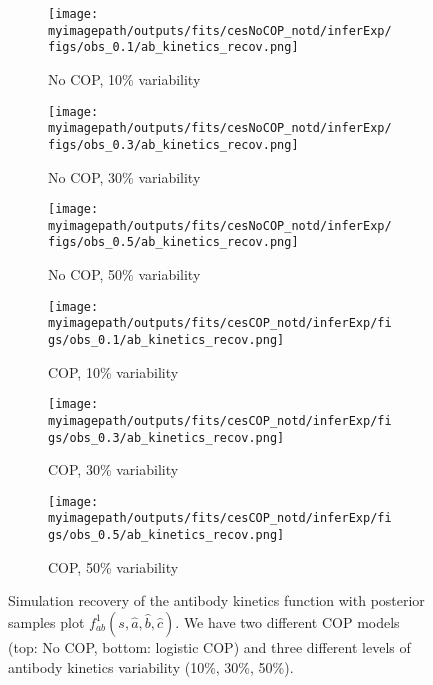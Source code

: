 \begin{figure}[H]

    \centering
    \begin{subfigure}{0.31\textwidth}
        \centering
        \texttt{[image: \\myimagepath/outputs/fits/cesNoCOP\_notd/inferExp/figs/obs\_0.1/ab\_kinetics\_recov.png]}
        \caption{No COP, 10\% variability}
    \end{subfigure}
    \begin{subfigure}{0.31\textwidth}
        \centering
        \texttt{[image: \\myimagepath/outputs/fits/cesNoCOP\_notd/inferExp/figs/obs\_0.3/ab\_kinetics\_recov.png]}
        \caption{No COP, 30\% variability}
    \end{subfigure}
    \begin{subfigure}{0.31\textwidth}
        \centering
        \texttt{[image: \\myimagepath/outputs/fits/cesNoCOP\_notd/inferExp/figs/obs\_0.5/ab\_kinetics\_recov.png]}
        \caption{No COP, 50\% variability}
    \end{subfigure}
    
  \begin{subfigure}{0.31\textwidth}
        \centering
        \texttt{[image: \\myimagepath/outputs/fits/cesCOP\_notd/inferExp/figs/obs\_0.1/ab\_kinetics\_recov.png]}
        \caption{ COP, 10\% variability}
    \end{subfigure}
    \begin{subfigure}{0.31\textwidth}
        \centering
        \texttt{[image: \\myimagepath/outputs/fits/cesCOP\_notd/inferExp/figs/obs\_0.3/ab\_kinetics\_recov.png]}
        \caption{ COP, 30\% variability}
    \end{subfigure}
    \begin{subfigure}{0.31\textwidth}
        \centering
        \texttt{[image: \\myimagepath/outputs/fits/cesCOP\_notd/inferExp/figs/obs\_0.5/ab\_kinetics\_recov.png]}
        \caption{ COP, 50\% variability}
    \end{subfigure}
    
    \caption{Simulation recovery of the antibody kinetics function with posterior samples plot $f^1_{ab}(s, \hat{a}, \hat{b}, \hat{c})$. We have two different COP models (top: No COP, bottom: logistic COP) and three different levels of antibody kinetics variability (10\%, 30\%, 50\%). \label{fit2:ab}}
   \end{figure}
  